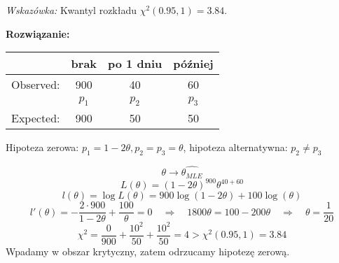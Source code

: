 \documentclass[11pt]{article}
\begin{document}
\begin{enumerate}
    \par 
    \textit{Wskazówka: } Kwantyl rozkładu \(\chi^2(0.95, 1) = 3.84\).
    \par 
    \textbf{Rozwiązanie: }
    
        \begin{center}
    \begin{tabular}{ |c|c|c|c| }
    \hline
     & brak & po 1 dniu & później  \\ 
    \hline
    Observed: & 900 & 40 & 60 \\
    \hline 
     &  \(p_1\) & \(p_2\) & \(p_3\)\\
    \hline 
    Expected: & 900 & 50 & 50 \\
    \hline
    \end{tabular}
    \end{center}
     Hipoteza zerowa: \(p_1 = 1 - 2\theta, p_2 = p_3 = \theta \), hipoteza alternatywna: \(p_2 \neq p_3\)
     \par 
     \[\theta \rightarrow \hat{\theta_{MLE}}\]
     \[L(\theta) = (1 - 2 \theta)^{900} \theta^{40+60}\]
     \[l(\theta) = \log L(\theta) = 900 \log(1-2\theta) + 100 \log(\theta)\]
     \[l'(\theta) = - \frac{2\cdot 900}{1 - 2 \theta} + \frac{100}{\theta} = 0 \quad \Rightarrow \quad 1800 \theta= 100 - 200 \theta \quad \Rightarrow \quad \theta= \frac{1}{20}\]
     \[\chi^2 = \frac{0}{900} + \frac{10^2}{50} + \frac{10^2}{50} = 4 > \chi^2(0.95, 1) = 3.84\]
     Wpadamy w obszar krytyczny, zatem odrzucamy hipotezę zerową. 
\end{enumerate}
\end{document}
